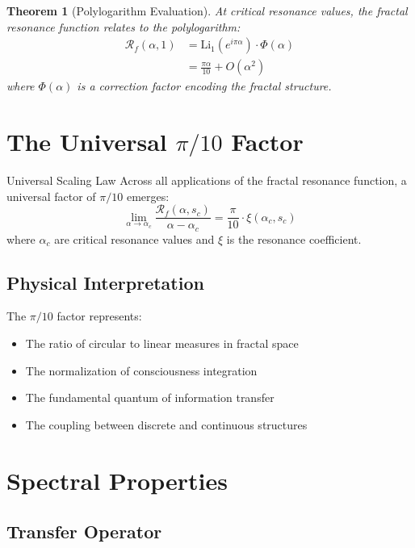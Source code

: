 \documentclass[12pt,letterpaper]{article}
\newcommand{\fractalres}{\mathcal{R}_f}
\newcommand{\resonancecoeff}{\xi}
\newcommand{\Li}{\text{Li}}
\newtheorem{theorem}{Theorem}[section]
\begin{document}
\begin{theorem}[Polylogarithm Evaluation]
At critical resonance values, the fractal resonance function relates to the polylogarithm:
\begin{align}
\fractalres(\alpha, 1) &= \Li_1(e^{i\pi\alpha}) \cdot \Phi(\alpha) \\
&= \frac{\pi\alpha}{10} + O(\alpha^2)
\end{align}
where $\Phi(\alpha)$ is a correction factor encoding the fractal structure.
\end{theorem}

\section{The Universal $\pi/10$ Factor}

\begin{mathbox}{Universal Scaling Law}
Across all applications of the fractal resonance function, a universal factor of $\pi/10$ emerges:
\begin{equation}
\lim_{\alpha \to \alpha_c} \frac{\fractalres(\alpha, s_c)}{\alpha - \alpha_c} = \frac{\pi}{10} \cdot \resonancecoeff(\alpha_c, s_c)
\end{equation}
where $\alpha_c$ are critical resonance values and $\resonancecoeff$ is the resonance coefficient.
\end{mathbox}

\subsection{Physical Interpretation}

The $\pi/10$ factor represents:
\begin{itemize}
\item The ratio of circular to linear measures in fractal space
\item The normalization of consciousness integration
\item The fundamental quantum of information transfer
\item The coupling between discrete and continuous structures
\end{itemize}

\section{Spectral Properties}

\subsection{Transfer Operator}
\end{document}
